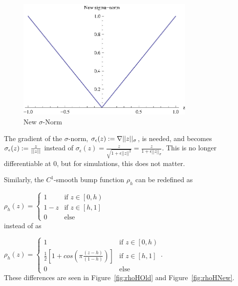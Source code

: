 \documentclass[10pt, conference]{IEEEtran}
\begin{document}
\begin{figure}[!b]
  \begin{center}
    \includegraphics[width=3.45in]{sigmaNormNew}
  \end{center}

  \caption{\small New $\sigma$-Norm}
  \label{fig:newSigmaNorm}
\end{figure}

%
The gradient of the $\sigma$-norm, $\sigma_{\epsilon}(z) := \nabla \lvert\lvert z\rvert\rvert_{\sigma}$, is needed, and becomes $\sigma_{\epsilon}(z) := \frac{z}{\lvert\lvert z\rvert\rvert}$ instead of $\sigma_{\epsilon}(z) = \frac{z}{\sqrt{1 + \epsilon||z||^2}} = \frac{z}{1 + \epsilon||z||_{\sigma}}$.
%
This is no longer differentiable at $0$, but for simulations, this does not matter.

Similarly, the $C^1$-smooth bump function $\rho_{h}$ can be redefined as 

$\rho_{h}\left(z\right) = \left\{ \begin{array}{ll} 
1 & \textrm{if } z \in \left[0, h\right) \\
1 - z & \textrm{if } z \in \left[h, 1\right] \\
0 & \textrm{else} \end{array} \right. $\\
instead of as 

$\rho_{h}\left(z\right) = \left\{ \begin{array}{ll} 
1 & \textrm{if } z \in \left[0, h\right) \\
\frac{1}{2}\left[1 + cos\left(\pi\frac{\left(z - h\right)}{\left(1 - h\right)}\right)\right] & \textrm{if } z \in \left[h, 1\right] \\
0 & \textrm{else} \end{array} \right. $.\\
These differences are seen in Figure~\ref{fig:rhoHOld} and Figure~\ref{fig:rhoHNew}.
\end{document}

